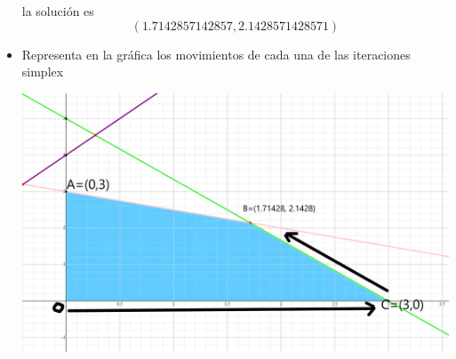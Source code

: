 \begin{itemize}
la solución es
$$(1.7142857142857, 2.1428571428571)$$

    \item Representa en la gráfica los movimientos de cada una de las iteraciones simplex
    
    \includegraphics[scale=0.2]{Ejercicios/graficas/Ejercicio2_2.png}
    
\end{itemize}
